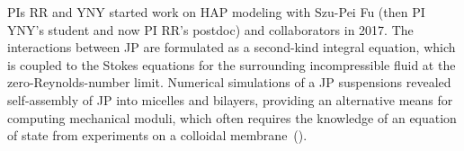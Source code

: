 %
%
PIs RR and YNY started work on HAP modeling with Szu-Pei Fu
(then PI YNY's student and now PI RR's postdoc) and collaborators in 2017. 
The interactions between JP are formulated as a second-kind integral
equation, which is coupled to the Stokes equations for the surrounding
incompressible fluid at the zero-Reynolds-number limit. Numerical
simulations of a JP suspensions revealed self-assembly of JP into
micelles and bilayers, providing an alternative means for computing
mechanical moduli, which often requires the knowledge of an equation of
state from experiments on a colloidal
membrane~(\cite{Balchunas2019_SM}).

